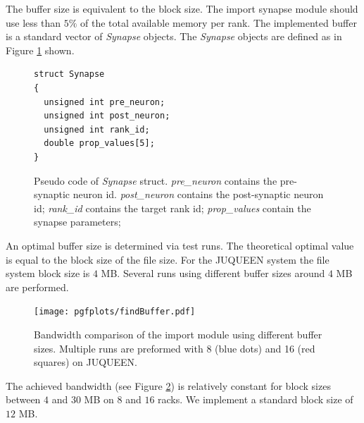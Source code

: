 The buffer size is equivalent to the block size.
The import synapse module should use less than $5\%$ of the total available memory per rank.
The implemented buffer is a standard vector of \emph{Synapse} objects.
The \emph{Synapse} objects are defined as in Figure \ref{fig:synapsebuffer} shown.
\begin{figure}[ht!]
\begin{lstlisting}[style=cppcode]
struct Synapse
{
  unsigned int pre_neuron;
  unsigned int post_neuron;
  unsigned int rank_id;
  double prop_values[5];
}
\end{lstlisting}
\caption[Pseudo code of \emph{Synapse} struct]{Pseudo code of \emph{Synapse} struct.
\emph{pre\_neuron} contains the pre-synaptic neuron id.
\emph{post\_neuron} contains the post-synaptic neuron id;
\emph{rank\_id} contains the target rank id;
\emph{prop\_values} contain the synapse parameters;
}
\label{fig:synapsebuffer}
\end{figure}

An optimal buffer size is determined via test runs.
The theoretical optimal value is equal to the block size of the file size.
For the JUQUEEN system the file system block size is $4$ MB.
Several runs using different buffer sizes around $4$ MB are performed.
\begin{figure}[h!]
\begin{center}
 \texttt{[image: pgfplots/findBuffer.pdf]}
\end{center}
\caption[Bandwidth comparison of the import module using different buffer sizes]{Bandwidth comparison of the import module using different buffer sizes.
Multiple runs are preformed with 8 (blue dots) and 16 (red squares) on JUQUEEN.}
\label{schumann:fig:findBuffer}
\end{figure}
The achieved bandwidth (see Figure \ref{schumann:fig:findBuffer}) is relatively constant for block sizes between $4$ and $30$ MB on $8$ and $16$ racks.
We implement a standard block size of $12$ MB.
